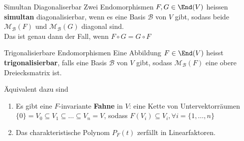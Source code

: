 \begin{definition}{Simultan Diagonaliserbar}
    Zwei Endomorphismen $F,G \in \End(V)$ heissen \textbf{simultan} diagonalisierbar, wenn es eine Basis $\mathcal{B}$ von $V$ gibt, sodass beide $\mathcal{M}_{\mathcal{B}}(F)$ und $\mathcal{M}_{\mathcal{B}}(G)$ diagonal sind.\\
    Das ist genau dann der Fall, wenn $F \circ G = G \circ F$
\end{definition}


\begin{definition}{Trigonalisierbare Endomorphismen}
    Eine Abbildung $F \in \End(V)$ heisst \textbf{trigonalisierbar}, falls eine Basis $\mathcal{B}$ von $V$ gibt, sodass $\mathcal{M}_{\mathcal{B}}(F)$ eine obere Dreiecksmatrix ist.
\end{definition}
Äquivalent dazu sind
\begin{enumerate}
    \item	Es gibt eine $F$-invariante \textbf{Fahne} in $V$: eine Kette von Untervektorräumen $\{0\} = V_0 \subseteq V_1 \subseteq \ldots \subseteq V_n = V$, sodass $F(V_i) \subseteq V_i, \forall i = \{1, \ldots, n\}$
    \item   Das charakteristische Polynom $P_F(t)$ zerfällt in Linearfaktoren.
\end{enumerate}


